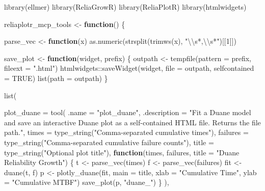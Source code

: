 \documentclass[
  letterpaper,
  DIV=11,
  numbers=noendperiod]{scrreprt}
\newenvironment{Shaded}{\begin{snugshade}}{\end{snugshade}}
\newcommand{\AttributeTok}[1]{\textcolor[rgb]{0.40,0.45,0.13}{#1}}
\newcommand{\ConstantTok}[1]{\textcolor[rgb]{0.56,0.35,0.01}{#1}}
\newcommand{\ControlFlowTok}[1]{\textcolor[rgb]{0.00,0.23,0.31}{\textbf{#1}}}
\newcommand{\DecValTok}[1]{\textcolor[rgb]{0.68,0.00,0.00}{#1}}
\newcommand{\FunctionTok}[1]{\textcolor[rgb]{0.28,0.35,0.67}{#1}}
\newcommand{\NormalTok}[1]{\textcolor[rgb]{0.00,0.23,0.31}{#1}}
\newcommand{\OtherTok}[1]{\textcolor[rgb]{0.00,0.23,0.31}{#1}}
\newcommand{\SpecialCharTok}[1]{\textcolor[rgb]{0.37,0.37,0.37}{#1}}
\newcommand{\StringTok}[1]{\textcolor[rgb]{0.13,0.47,0.30}{#1}}
\begin{document}
\begin{Shaded}
\begin{Highlighting}[]
\FunctionTok{library}\NormalTok{(ellmer)}
\FunctionTok{library}\NormalTok{(ReliaGrowR)}
\FunctionTok{library}\NormalTok{(ReliaPlotR)}
\FunctionTok{library}\NormalTok{(htmlwidgets)}

\NormalTok{reliaplotr\_mcp\_tools }\OtherTok{\textless{}{-}} \ControlFlowTok{function}\NormalTok{() \{}

\NormalTok{  parse\_vec }\OtherTok{\textless{}{-}} \ControlFlowTok{function}\NormalTok{(x) }\FunctionTok{as.numeric}\NormalTok{(}\FunctionTok{strsplit}\NormalTok{(}\FunctionTok{trimws}\NormalTok{(x), }\StringTok{"}\SpecialCharTok{\textbackslash{}\textbackslash{}}\StringTok{s*,}\SpecialCharTok{\textbackslash{}\textbackslash{}}\StringTok{s*"}\NormalTok{)[[}\DecValTok{1}\NormalTok{]])}

\NormalTok{  save\_plot }\OtherTok{\textless{}{-}} \ControlFlowTok{function}\NormalTok{(widget, prefix) \{}
\NormalTok{    outpath }\OtherTok{\textless{}{-}} \FunctionTok{tempfile}\NormalTok{(}\AttributeTok{pattern =}\NormalTok{ prefix, }\AttributeTok{fileext =} \StringTok{".html"}\NormalTok{)}
\NormalTok{    htmlwidgets}\SpecialCharTok{::}\FunctionTok{saveWidget}\NormalTok{(widget, }\AttributeTok{file =}\NormalTok{ outpath, }\AttributeTok{selfcontained =} \ConstantTok{TRUE}\NormalTok{)}
    \FunctionTok{list}\NormalTok{(}\AttributeTok{path =}\NormalTok{ outpath)}
\NormalTok{  \}}

  \FunctionTok{list}\NormalTok{(}

    \AttributeTok{plot\_duane =} \FunctionTok{tool}\NormalTok{(}
      \AttributeTok{.name        =} \StringTok{"plot\_duane"}\NormalTok{,}
      \AttributeTok{.description =} \StringTok{"Fit a Duane model and save an interactive Duane plot as a}
\StringTok{                      self{-}contained HTML file. Returns the file path."}\NormalTok{,}
      \AttributeTok{times    =} \FunctionTok{type\_string}\NormalTok{(}\StringTok{"Comma{-}separated cumulative times"}\NormalTok{),}
      \AttributeTok{failures =} \FunctionTok{type\_string}\NormalTok{(}\StringTok{"Comma{-}separated cumulative failure counts"}\NormalTok{),}
      \AttributeTok{title    =} \FunctionTok{type\_string}\NormalTok{(}\StringTok{"Optional plot title"}\NormalTok{),}
      \ControlFlowTok{function}\NormalTok{(times, failures, }\AttributeTok{title =} \StringTok{"Duane Reliability Growth"}\NormalTok{) \{}
\NormalTok{        t   }\OtherTok{\textless{}{-}} \FunctionTok{parse\_vec}\NormalTok{(times)}
\NormalTok{        f   }\OtherTok{\textless{}{-}} \FunctionTok{parse\_vec}\NormalTok{(failures)}
\NormalTok{        fit }\OtherTok{\textless{}{-}} \FunctionTok{duane}\NormalTok{(t, f)}
\NormalTok{        p   }\OtherTok{\textless{}{-}} \FunctionTok{plotly\_duane}\NormalTok{(fit, }\AttributeTok{main =}\NormalTok{ title,}
                            \AttributeTok{xlab =} \StringTok{"Cumulative Time"}\NormalTok{,}
                            \AttributeTok{ylab =} \StringTok{"Cumulative MTBF"}\NormalTok{)}
        \FunctionTok{save\_plot}\NormalTok{(p, }\StringTok{"duane\_"}\NormalTok{)}
\NormalTok{      \}}
\NormalTok{    ),}


\end{Highlighting}
\end{Shaded}
\end{document}
